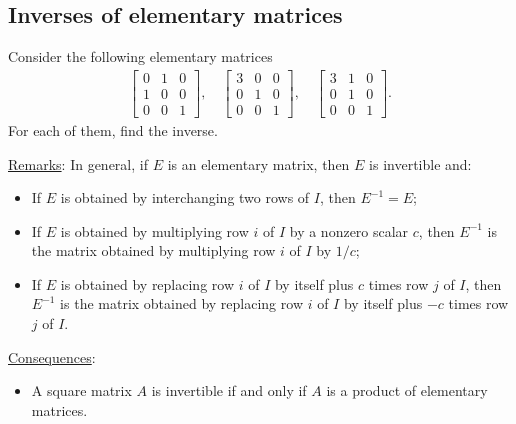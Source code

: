 \documentclass[12pt,a4paper]{article}
\newcounter{example}[section]
\begin{document}
\newpage

\phantom{2}

\vfill

\newpage
	
\subsection{Inverses of elementary matrices}

\begin{example}
Consider the following elementary matrices
	\begin{align*}
	\begin{bmatrix}
	0 & 1 & 0 \\
	1 & 0 & 0 \\
	0 & 0 & 1
	\end{bmatrix} , \quad 
	\begin{bmatrix}
	3 & 0 & 0 \\
	0 & 1 & 0 \\
	0 & 0 & 1
	\end{bmatrix} , \quad
	\begin{bmatrix}
	3 & 1 & 0 \\
	0 & 1 & 0 \\
	0 & 0 & 1 
	\end{bmatrix} .
	\end{align*} 
For each of them, find the inverse.
\end{example}

\vfill

\noindent\underline{Remarks}: In general, if $E$ is an elementary matrix, then $E$ is invertible and:
	\begin{itemize}
	\item If $E$ is obtained by interchanging two rows of $I$, then $E^{-1} = E$;
	\item If $E$ is obtained by multiplying row $i$ of $I$ by a nonzero scalar $c$, then $E^{-1}$ is the matrix obtained by multiplying row $i$ of $I$ by $1/c$;
	\item If $E$ is obtained by replacing row $i$ of $I$ by itself plus $c$ times row $j$ of $I$, then $E^{-1}$ is the matrix obtained by replacing row $i$ of $I$ by itself plus $-c$ times row $j$ of $I$.
	\end{itemize}
	
\noindent\underline{Consequences}:
	\begin{itemize}
	\item A square matrix $A$ is invertible if and only if $A$ is a product of elementary matrices.
	\end{itemize}
\end{document}
